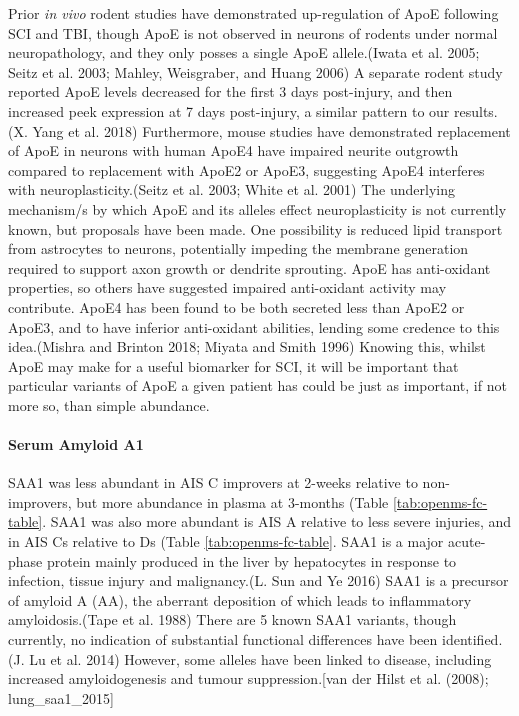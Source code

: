 \documentclass[9pt,lineno]{elife}
\begin{document}
\begin{landscape}
\begin{landscape}
Prior \emph{in vivo} rodent studies have demonstrated up-regulation of ApoE following SCI and TBI, though ApoE is not observed in neurons of rodents under normal neuropathology, and they only posses a single ApoE allele.(Iwata et al. 2005; Seitz et al. 2003; Mahley, Weisgraber, and Huang 2006) A separate rodent study reported ApoE levels decreased for the first 3 days post-injury, and then increased peek expression at 7 days post-injury, a similar pattern to our results.(X. Yang et al. 2018) Furthermore, mouse studies have demonstrated replacement of ApoE in neurons with human ApoE4 have impaired neurite outgrowth compared to replacement with ApoE2 or ApoE3, suggesting ApoE4 interferes with neuroplasticity.(Seitz et al. 2003; White et al. 2001) The underlying mechanism/s by which ApoE and its alleles effect neuroplasticity is not currently known, but proposals have been made. One possibility is reduced lipid transport from astrocytes to neurons, potentially impeding the membrane generation required to support axon growth or dendrite sprouting. ApoE has anti-oxidant properties, so others have suggested impaired anti-oxidant activity may contribute. ApoE4 has been found to be both secreted less than ApoE2 or ApoE3, and to have inferior anti-oxidant abilities, lending some credence to this idea.(Mishra and Brinton 2018; Miyata and Smith 1996) Knowing this, whilst ApoE may make for a useful biomarker for SCI, it will be important that particular variants of ApoE a given patient has could be just as important, if not more so, than simple abundance.

\hypertarget{serum-amyloid-a1}{%
\paragraph{Serum Amyloid A1}\label{serum-amyloid-a1}}

SAA1 was less abundant in AIS C improvers at 2-weeks relative to non-improvers, but more abundance in plasma at 3-months (Table \ref{tab:openms-fc-table}.
SAA1 was also more abundant is AIS A relative to less severe injuries, and in AIS Cs relative to Ds (Table \ref{tab:openms-fc-table}.
SAA1 is a major acute-phase protein mainly produced in the liver by hepatocytes in response to infection, tissue injury and malignancy.(L. Sun and Ye 2016) SAA1 is a precursor of amyloid A (AA), the aberrant deposition of which leads to inflammatory amyloidosis.(Tape et al. 1988) There are 5 known SAA1 variants, though currently, no indication of substantial functional differences have been identified.(J. Lu et al. 2014) However, some alleles have been linked to disease, including increased amyloidogenesis and tumour suppression.{[}van der Hilst et al. (2008); lung\_saa1\_2015{]}


\end{landscape}
\end{landscape}
\end{document}
